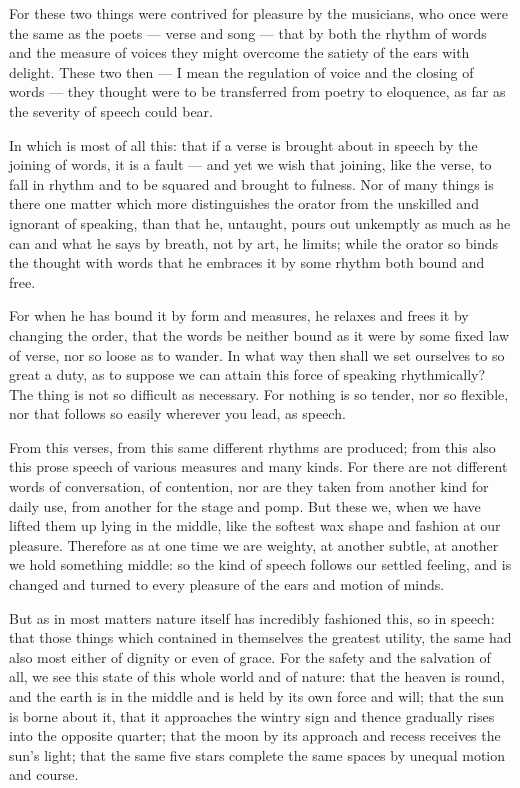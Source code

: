  For these two things were contrived for pleasure by the musicians, who once were the same as the poets — verse and song — that by both the rhythm of words and the measure of voices they might overcome the satiety of the ears with delight. These two then — I mean the regulation of voice and the closing of words — they thought were to be transferred from poetry to eloquence, as far as the severity of speech could bear.

 In which is most of all this: that if a verse is brought about in speech by the joining of words, it is a fault — and yet we wish that joining, like the verse, to fall in rhythm and to be squared and brought to fulness. Nor of many things is there one matter which more distinguishes the orator from the unskilled and ignorant of speaking, than that he, untaught, pours out unkemptly as much as he can and what he says by breath, not by art, he limits; while the orator so binds the thought with words that he embraces it by some rhythm both bound and free.

 For when he has bound it by form and measures, he relaxes and frees it by changing the order, that the words be neither bound as it were by some fixed law of verse, nor so loose as to wander. In what way then shall we set ourselves to so great a duty, as to suppose we can attain this force of speaking rhythmically? The thing is not so difficult as necessary. For nothing is so tender, nor so flexible, nor that follows so easily wherever you lead, as speech.

 From this verses, from this same different rhythms are produced; from this also this prose speech of various measures and many kinds. For there are not different words of conversation, of contention, nor are they taken from another kind for daily use, from another for the stage and pomp. But these we, when we have lifted them up lying in the middle, like the softest wax shape and fashion at our pleasure. Therefore as at one time we are weighty, at another subtle, at another we hold something middle: so the kind of speech follows our settled feeling, and is changed and turned to every pleasure of the ears and motion of minds.

 But as in most matters nature itself has incredibly fashioned this, so in speech: that those things which contained in themselves the greatest utility, the same had also most either of dignity or even of grace. For the safety and the salvation of all, we see this state of this whole world and of nature: that the heaven is round, and the earth is in the middle and is held by its own force and will; that the sun is borne about it, that it approaches the wintry sign and thence gradually rises into the opposite quarter; that the moon by its approach and recess receives the sun's light; that the same five stars complete the same spaces by unequal motion and course.

